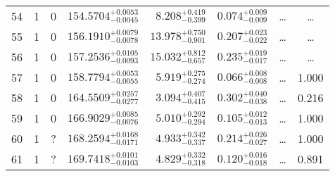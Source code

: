 \begin{table*}[!]
\begin{tabular}{llcrrlrc}
54 & 1 & 0 & $    154.5704_{-      0.0045}^{+      0.0053}$ & $       8.208_{-       0.399}^{+       0.419}$ & $       0.074_{-       0.009}^{+       0.009}$ & \multicolumn{1}{c}{\dots} & \dots \\[1pt]
55 & 1 & 0 & $    156.1910_{-      0.0078}^{+      0.0079}$ & $      13.978_{-       0.901}^{+       0.750}$ & $       0.207_{-       0.022}^{+       0.023}$ & \multicolumn{1}{c}{\dots} & \dots \\[1pt]
56 & 1 & 0 & $    157.2536_{-      0.0093}^{+      0.0105}$ & $      15.032_{-       0.657}^{+       0.812}$ & $       0.235_{-       0.017}^{+       0.019}$ & \multicolumn{1}{c}{\dots} & \dots \\[1pt]
57 & 1 & 0 & $    158.7794_{-      0.0055}^{+      0.0053}$ & $       5.919_{-       0.274}^{+       0.275}$ & $       0.066_{-       0.008}^{+       0.008}$ & \multicolumn{1}{c}{\dots} & 1.000\\[1pt]
58 & 1 & 0 & $    164.5509_{-      0.0277}^{+      0.0257}$ & $       3.094_{-       0.415}^{+       0.407}$ & $       0.302_{-       0.038}^{+       0.040}$ & \multicolumn{1}{c}{\dots} & 0.216 \\[1pt]
59 & 1 & 0 & $    166.9029_{-      0.0076}^{+      0.0085}$ & $       5.010_{-       0.294}^{+       0.292}$ & $       0.105_{-       0.013}^{+       0.012}$ & \multicolumn{1}{c}{\dots} & 1.000\\[1pt]
60 & 1 & ? & $    168.2594_{-      0.0171}^{+      0.0168}$ & $       4.933_{-       0.337}^{+       0.342}$ & $       0.214_{-       0.027}^{+       0.026}$ & \multicolumn{1}{c}{\dots} & 1.000\\[1pt]
61 & 1 & ? & $    169.7418_{-      0.0103}^{+      0.0101}$ & $       4.829_{-       0.318}^{+       0.332}$ & $       0.120_{-       0.018}^{+       0.016}$ & \multicolumn{1}{c}{\dots} & 0.891\\[1pt]
\hline
\end{tabular}
\end{table*}

